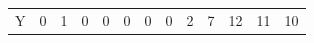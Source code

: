 \documentclass{bredelebeamer}
\begin{document}
\begin{frame}
\begin{table}[]
\begin{tabular}{lllllllllllll}
\multicolumn{1}{l|}{Y}  & \multicolumn{1}{l|}{0} & \multicolumn{1}{l|}{1} & \multicolumn{1}{l|}{0} & \multicolumn{1}{l|}{0} & \multicolumn{1}{l|}{0}                         & \multicolumn{1}{l|}{0}                         & \multicolumn{1}{l|}{0}                         & \multicolumn{1}{l|}{2}                         & \multicolumn{1}{l|}{7}                          & \multicolumn{1}{l|}{12}                         & \multicolumn{1}{l|}{11} & \multicolumn{1}{l|}{10} \\ \cline{2-13} 
\end{tabular}
\end{table}  
    
\end{frame}
\end{document}
